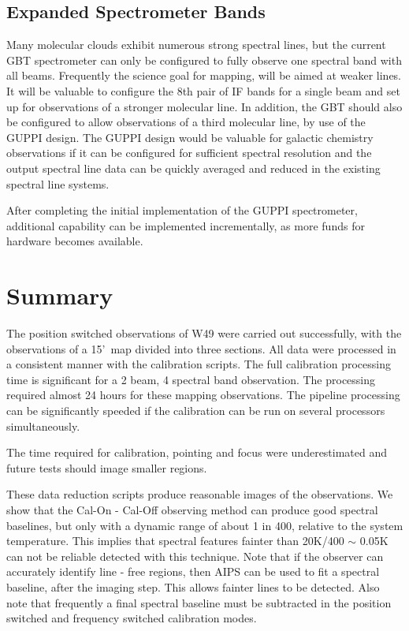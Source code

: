 \documentclass[12pt,twoside]{article}
\newcommand{\arcm}{'~}
\begin{document}
\subsection{Expanded Spectrometer Bands}
Many molecular clouds exhibit numerous strong spectral lines, but the
current GBT spectrometer can only be configured to fully observe one spectral 
band with all beams.   Frequently the science goal for mapping, will
be aimed at weaker lines.  It will be valuable to configure the 8th pair of IF
bands for a single beam and set up for observations of a stronger molecular
line.   In addition, the GBT should also be configured to allow observations
of a third molecular line, by use of the GUPPI design.   The GUPPI design
would be valuable for galactic chemistry observations if it can be configured
for sufficient spectral resolution and the output spectral line data
can be quickly averaged and reduced in the existing spectral line systems.

After completing the initial implementation of the GUPPI spectrometer, additional
capability can be implemented incrementally, as more funds for
hardware becomes available.

\section{Summary}

The position switched observations of W49 were carried out successfully,
with the observations of a 15\arcm map divided into three sections.
All data were processed in a consistent manner with the calibration scripts.
The full calibration processing time is significant for a 2 beam, 4 spectral
band observation.  The processing required almost 24 hours for these
mapping observations.   The pipeline processing can be significantly
speeded if the calibration can be run on several processors simultaneously.

The time required for calibration, pointing and focus were underestimated
and future tests should image smaller regions.

These data reduction scripts produce reasonable images of the
observations.  We show that the Cal-On - Cal-Off observing method
can produce good spectral baselines, but only with a dynamic range of
about 1 in 400, relative to the system temperature.  This implies
that spectral features fainter than 20K/400 $\sim$ 0.05K can
not be reliable detected with this technique.
Note that if the observer can accurately identify line - free regions, then
AIPS can be used to fit a spectral baseline, after the imaging step.
This allows fainter lines to be detected.   Also note that frequently
a final spectral baseline must be subtracted in the position switched
and frequency switched calibration modes.
\end{document}
